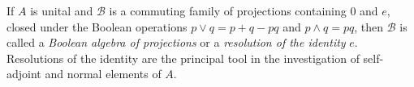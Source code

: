 If $A$ is unital and $\mathcal{B}$ is a commuting family of projections containing $0$ and $e$, closed under the Boolean operations $p \vee q = p + q - pq$ and $p \wedge q = pq$, then $\mathcal{B}$ is called a \textit{Boolean algebra of projections} or a \textit{resolution of the identity} $e$. Resolutions of the identity are the principal tool in the investigation of self-adjoint and normal elements of $A$.

